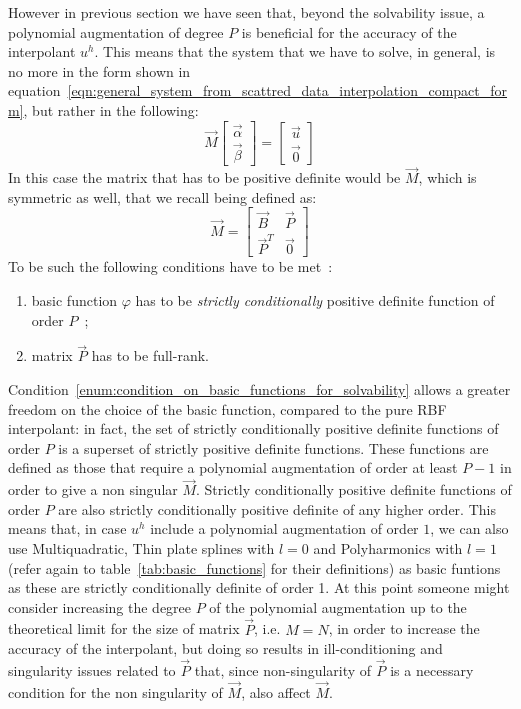 However in previous section we have seen that, beyond the solvability issue, a polynomial augmentation of degree $P$ is beneficial for the accuracy of the interpolant $u^h$. This means that the system that we have to solve, in general, is no more in the form shown in equation~\eqref{eqn:general_system_from_scattred_data_interpolation_compact_form}, but rather in the following:
\begin{equation}
\label{eqn:general_system_from_scattred_data_interpolation_poly_augmentation_compact_form}
\vec{M}
\begin{bmatrix}
	\vec{\alpha}  \\  \vec{\beta}
\end{bmatrix} = 
\begin{bmatrix}
	\vec{u}  \\  \vec{0}
\end{bmatrix}
\end{equation}
In this case the matrix that has to be positive definite would be $\vec{M}$, which is symmetric as well, that we recall being defined as:
\begin{equation}
\label{eqn:global_M_definition}
\vec{M} =
\begin{bmatrix}
	\vec{B}    &  \vec{P}  \\
	\vec{P}^T  &  \vec{0}
\end{bmatrix}
\end{equation}
To be such the following conditions have to be met~\cite{Miotti:phd_thesis}:
\begin{enumerate}
	\item basic function $\varphi$ has to be \emph{strictly conditionally} positive definite function of order $P$~\cite{Fasshauer:details_on_basic_functions};  \label{enum:condition_on_basic_functions_for_solvability}
	\item matrix $\vec{P}$ has to be full-rank.  \label{enum:condition_on_P_for_solvability}
\end{enumerate}
Condition~\ref{enum:condition_on_basic_functions_for_solvability} allows a greater freedom on the choice of the basic function, compared to the pure RBF interpolant: in fact, the set of strictly conditionally positive definite functions of order $P$ is a superset of strictly positive definite functions. These functions are defined as those that require a polynomial augmentation of order at least $P-1$ in order to give a non singular $\vec{M}$. Strictly conditionally positive definite functions of order $P$ are also strictly conditionally positive definite of any higher order. This means that, in case $u^h$ include a polynomial augmentation of order $1$, we can also use Multiquadratic, Thin plate splines with $l=0$ and Polyharmonics with $l=1$ (refer again to table~\ref{tab:basic_functions} for their definitions) as basic funtions as these are strictly conditionally definite of order 1. At this point someone might consider increasing the degree $P$ of the polynomial augmentation up to the theoretical limit for the size of matrix $\vec{P}$, i.e. $M=N$, in order to increase the accuracy of the interpolant, but doing so results in ill-conditioning and singularity issues related to $\vec{P}$ that, since non-singularity of $\vec{P}$ is a necessary condition for the non singularity of $\vec{M}$, also affect $\vec{M}$.

